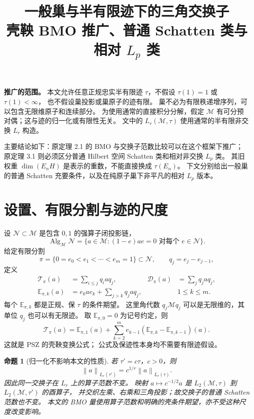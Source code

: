 \documentclass[UTF8,11pt,a4paper,fontset=fandol]{ctexart}
\title{一般巢与半有限迹下的三角交换子\\
\large 壳鞅 BMO 推广、普通 Schatten 类与相对 $L_p$ 类}
\author{}
\date{}
\newtheorem{proposition}[theorem]{命题}
\theoremstyle{remark}
\numberwithin{equation}{section}
\newcommand{\M}{\mathcal M}
\newcommand{\N}{\mathcal N}
\newcommand{\Alg}{\operatorname{Alg}_{\M}\N}
\newcommand{\T}{\mathcal T}
\newcommand{\D}{\mathcal D}
\newcommand{\E}{\mathbb E}
\newcommand{\norm}[1]{\left\lVert #1\right\rVert}
\begin{document}
\maketitle
\vspace{-2em}

\noindent\textbf{推广的范围。}
本文允许任意正规忠实半有限迹 $\tau$，不假设 $\tau(1)=1$ 或 $\tau(1)<\infty$，
也不假设巢投影或巢原子的迹有限。
巢不必为有限秩递增序列，可以包含无限维原子和连续部分。
为使用通常的直接积分分解，假定 $\M$ 有可分预对偶；这与迹的归一化或有限性无关。
文中的 $L_r(\M,\tau)$ 使用通常的半有限非交换 $L_r$ 构造。

主要结论如下：原定理 2.1 的 BMO 与交换子范数比较可以在这个框架下推广；
原定理 3.1 则必须区分普通 Hilbert 空间 Schatten 类和相对非交换 $L_p$ 类。
其旧权重 $\dim(E_nH)$ 是表示的重数，不能直接换成 $\tau(E_n)$。
下文分别给出一般巢的普通 Schatten 充要条件，以及在纯原子巢下非平凡的相对 $L_p$ 版本。

\section{设置、有限分割与迹的尺度}

设 $\N\subset\M$ 是包含 $0,1$ 的强算子闭投影链，
\[
 \Alg=\{a\in\M:(1-e)ae=0\text{ 对每个 }e\in\N\}.
\]
给定有限分割
\[
 \pi=\{0=e_0<e_1<\cdots<e_m=1\}\subset\N,
 \qquad q_j=e_j-e_{j-1},
\]
定义
\begin{align}
 \T_\pi(a)&=\sum_{i\leq j}q_i a q_j,
 &\D_\pi(a)&=\sum_jq_j a q_j,\label{eq:finite-triangle}\\
 \E_{\pi,k}(a)&=e_k a e_k+\sum_{j>k}q_j a q_j,
 &&1\leq k\leq m.\label{eq:shell}
\end{align}
每个 $\E_{\pi,k}$ 都是正规、保 $\tau$ 的条件期望。
这里角代数 $q_j\M q_j$ 可以是无限维的，其单位 $q_j$ 也可以有无限迹。
取 $\E_{\pi,0}=0$ 为记号约定，则
\begin{equation}\label{eq:transform}
 \T_\pi(a)=\E_{\pi,1}(a)+
   \sum_{k=2}^m e_{k-1}(\E_{\pi,k}-\E_{\pi,k-1})(a).
\end{equation}
这就是 PSZ \cite[Example 2.6, Proposition 3.4]{PSZ} 的壳鞅变换公式；
公式及保迹性本身均不需要有限迹假设。

\begin{proposition}[归一化不影响本文的性质]\label{prop:scale}
若 $\tau'=c\tau$，$c>0$，则
\[
 \norm a_{L_r(\tau')}=c^{1/r}\norm a_{L_r(\tau)}.
\]
因此同一交换子在 $L_r$ 上的算子范数不变。
映射 $a\mapsto c^{-1/2}a$ 是 $L_2(\M,\tau)$ 到 $L_2(\M,\tau')$ 的酉算子，
并交织左乘、右乘和三角投影；故交换子的普通 Schatten 范数也不变。
本文的 BMO 量使用算子范数和明确的壳条件期望，亦不受这种尺度改变影响。
\end{proposition}
\end{document}
